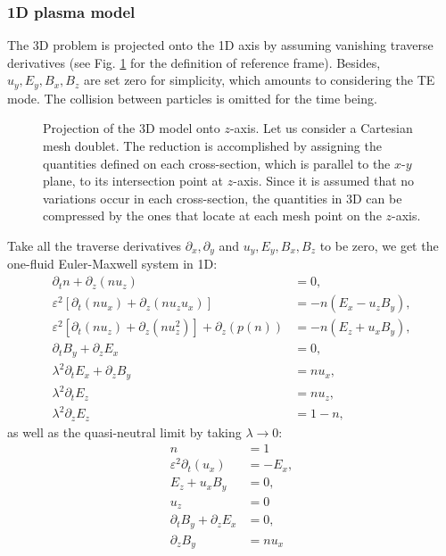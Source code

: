 \documentclass{article}
\begin{document}
\subsubsection{1D plasma model}
The 3D problem is projected onto the 1D axis by assuming vanishing traverse derivatives (see Fig. \ref{fig:1d-frame} for the definition of reference frame). Besides, $u_y, E_y, B_x, B_z$ are set zero for simplicity, which amounts to considering the TE mode. The collision between particles is omitted for the time being. 
\begin{figure}
    \centering
    \caption{Projection of the 3D model onto $z$-axis. Let us consider a Cartesian mesh doublet. The reduction is accomplished by assigning the quantities defined on each cross-section, which is parallel to the $x$-$y$ plane, to its intersection point at $z$-axis. Since it is assumed that no variations occur in each cross-section, the quantities in 3D can be compressed by the ones that locate at each mesh point on the $z$-axis.}
    \label{fig:1d-frame}
\end{figure}

Take all the traverse derivatives $\partial_x, \partial_y$ and $u_y, E_y, B_x, B_z$ to be zero, we get the one-fluid Euler-Maxwell system in 1D:
\begin{align*}
    \partial_t n + \partial_z(nu_z) &= 0, \\
    \varepsilon^2[\partial_t(nu_x) + \partial_z(nu_zu_x)] &= - n(E_x - u_zB_y), \\
    \varepsilon^2[\partial_t(nu_z) + \partial_z(nu_z^2)] + \partial_z(p(n)) &= -n(E_z + u_xB_y), \\
    \partial_t B_y + \partial_z E_x &= 0, \\
    \lambda^2 \partial_t E_x + \partial_z B_y &= nu_x, \\
    \lambda^2 \partial_t E_z &= nu_z, \\
    \lambda^2 \partial_z E_z &= 1 - n,
\end{align*}
as well as the quasi-neutral limit by taking $\lambda \rightarrow 0$:
\begin{align*}
    n &= 1\\
    \varepsilon^2 \partial_t(u_x) &= - E_x, \\
    E_z + u_xB_y &= 0, \\
    u_z &= 0 \\
    \partial_t B_y + \partial_z E_x &= 0, \\
    \partial_z B_y &= nu_x
\end{align*}
\end{document}
